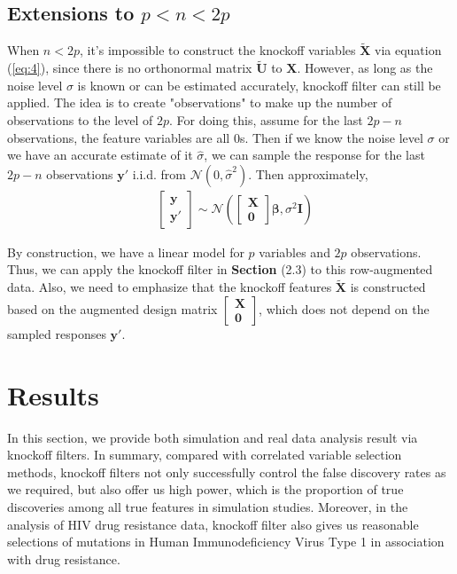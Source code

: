 \documentclass{uwstat572}
\begin{document}
\subsection{Extensions to $p<n<2p$}\label{sec:ext}
When $n< 2p$, it's impossible to construct the knockoff variables $\tilde{\bm{X}}$ via equation (\ref{eq:4}), since there is no orthonormal matrix $\tilde{\bm{U}}$ to $\bm{X}$. However, as long as the noise level $\sigma$ is known or can be estimated accurately, knockoff filter can still be applied. The idea is to create "observations" to make up the number of observations to the level of $2p$. For doing this, assume for the last $2p-n$ observations, the feature variables are all $0$s. Then if we know the noise level $\sigma$ or we have an accurate estimate of it $\hat\sigma$, we can sample the response for the last $2p-n$ observations $\bm{y}'$ i.i.d. from $\mathcal{N}(0, \hat{\sigma}^2)$. Then approximately, 
\begin{align*}
& \begin{bmatrix}\bm{y} \\ \bm{y'}\end{bmatrix} \sim 
\mathcal{N}\left(\begin{bmatrix}\bm{X} \\ \bm{0}\end{bmatrix}\bm{\beta}, \sigma^2 \bm{I} \right)
\end{align*}

By construction, we have a linear model for $p$ variables and $2p$ observations. Thus, we can apply the knockoff filter in \textbf{Section }(2.3) to this row-augmented data. Also, we need to emphasize that the knockoff features $\tilde{\bm{X}}$ is constructed based on the augmented design matrix $\begin{bmatrix}\bm{X} \\ \bm{0}\end{bmatrix}$, which does not depend on the sampled responses $\bm{y'}$.

\section{Results}
In this section, we provide both simulation and real data analysis result via knockoff filters. In summary, compared with correlated variable selection methods, knockoff filters not only successfully control the false discovery rates as we required, but also offer us high power, which is the proportion of true discoveries among all true features in simulation studies. Moreover, in the analysis of HIV drug resistance data, knockoff filter also gives us reasonable selections of mutations in Human Immunodeficiency Virus Type 1 in association with drug resistance.
\end{document}
